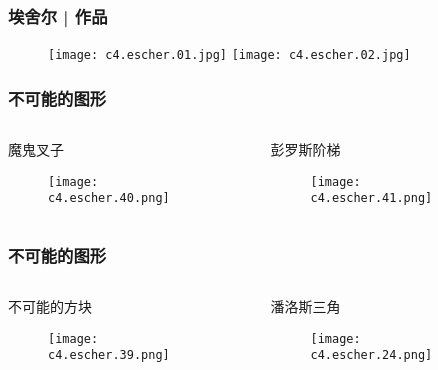 \begin{frame}
  \frametitle{埃舍尔 | 作品}
  \begin{figure}
    \centering
    \texttt{[image: c4.escher.01.jpg]}\quad
    \texttt{[image: c4.escher.02.jpg]}
  \end{figure}
\end{frame}

\begin{frame}
  \frametitle{不可能的图形}
  \begin{columns}
    \begin{block}{魔鬼叉子}
      \begin{figure}
        \centering
        \texttt{[image: c4.escher.40.png]}
      \end{figure}
    \end{block}
    \begin{block}{彭罗斯阶梯}
      \begin{figure}
        \centering
        \texttt{[image: c4.escher.41.png]}
      \end{figure}
    \end{block}
  \end{columns}
\end{frame}

\begin{frame}
  \frametitle{不可能的图形}
  \begin{columns}
    \begin{block}{不可能的方块}
      \begin{figure}
        \centering
        \texttt{[image: c4.escher.39.png]}
      \end{figure}
    \end{block}
    \begin{block}{潘洛斯三角}
      \begin{figure}
        \centering
        \texttt{[image: c4.escher.24.png]}
      \end{figure}
    \end{block}
  \end{columns}
\end{frame}


